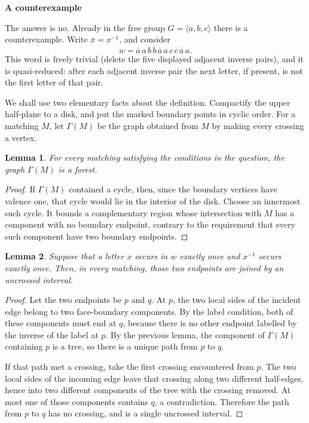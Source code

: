 \documentclass[12pt]{article}
\newtheorem{lemma}{Lemma}
\newcommand{\ol}{\overline}
\begin{document}
\begin{center}
{\bf A counterexample}
\end{center}

The answer is no.  Already in the free group \(G=\langle a,b,c\rangle\) there is a counterexample.  Write \(\ol x=x^{-1}\), and consider
\[
        w=\ol a\,a\, b\,\ol b\,\ol a\,a\, c\,\ol c\,\ol a\,a .
\]
This word is freely trivial (delete the five displayed adjacent inverse
pairs), and it is quasi-reduced: after each adjacent inverse pair the
next letter, if present, is not the first letter of that pair.

We shall use two elementary facts about the definition.  Compactify the
upper half-plane to a disk, and put the marked boundary points in cyclic
order.  For a matching \(M\), let \(\Gamma(M)\) be the graph obtained
from \(M\) by making every crossing a vertex.

\begin{lemma}
For every matching satisfying the conditions in the question, the graph
\(\Gamma(M)\) is a forest.
\end{lemma}

\begin{proof}
If \(\Gamma(M)\) contained a cycle, then, since the boundary vertices
have valence one, that cycle would lie in the interior of the disk.
Choose an innermost such cycle.  It bounds a complementary region whose
intersection with \(M\) has a component with no boundary endpoint,
contrary to the requirement that every such component have two boundary
endpoints.
\end{proof}

\begin{lemma}
Suppose that a letter \(x\) occurs in \(w\) exactly once and \(x^{-1}\)
occurs exactly once.  Then, in every matching, those two endpoints are
joined by an uncrossed interval.
\end{lemma}

\begin{proof}
Let the two endpoints be \(p\) and \(q\).  At \(p\), the two local sides
of the incident edge belong to two face-boundary components.  By the
label condition, both of these components must end at \(q\), because
there is no other endpoint labelled by the inverse of the label at
\(p\).  By the previous lemma, the component of \(\Gamma(M)\) containing
\(p\) is a tree, so there is a unique path from \(p\) to \(q\).

If that path met a crossing, take the first crossing encountered from
\(p\).  The two local sides of the incoming edge leave that crossing
along two different half-edges, hence into two different components of
the tree with the crossing removed.  At most one of those components
contains \(q\), a contradiction.  Therefore the path from \(p\) to \(q\)
has no crossing, and is a single uncrossed interval.
\end{proof}
\end{document}
